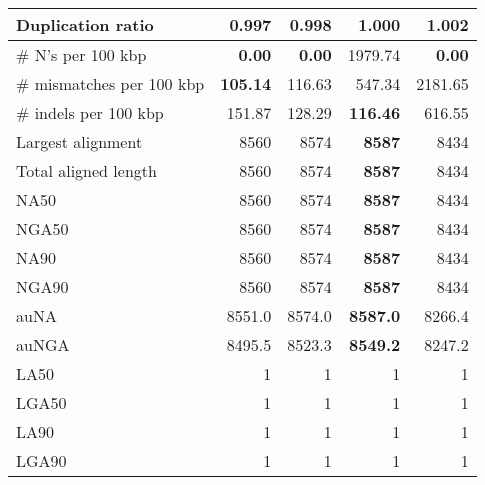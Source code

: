 \documentclass[12pt,a4paper]{article}
\begin{document}
\begin{table}[ht]
\begin{center}
\begin{tabular}{|l*{4}{|r}|}
Duplication ratio & {\bf 0.997} & 0.998 & 1.000 & 1.002 \\ \hline
\# N's per 100 kbp & {\bf 0.00} & {\bf 0.00} & 1979.74 & {\bf 0.00} \\ \hline
\# mismatches per 100 kbp & {\bf 105.14} & 116.63 & 547.34 & 2181.65 \\ \hline
\# indels per 100 kbp & 151.87 & 128.29 & {\bf 116.46} & 616.55 \\ \hline
Largest alignment & 8560 & 8574 & {\bf 8587} & 8434 \\ \hline
Total aligned length & 8560 & 8574 & {\bf 8587} & 8434 \\ \hline
NA50 & 8560 & 8574 & {\bf 8587} & 8434 \\ \hline
NGA50 & 8560 & 8574 & {\bf 8587} & 8434 \\ \hline
NA90 & 8560 & 8574 & {\bf 8587} & 8434 \\ \hline
NGA90 & 8560 & 8574 & {\bf 8587} & 8434 \\ \hline
auNA & 8551.0 & 8574.0 & {\bf 8587.0} & 8266.4 \\ \hline
auNGA & 8495.5 & 8523.3 & {\bf 8549.2} & 8247.2 \\ \hline
LA50 & 1 & 1 & 1 & 1 \\ \hline
LGA50 & 1 & 1 & 1 & 1 \\ \hline
LA90 & 1 & 1 & 1 & 1 \\ \hline
LGA90 & 1 & 1 & 1 & 1 \\ \hline
\end{tabular}
\end{center}
\end{table}
\end{document}
